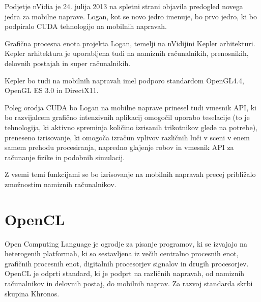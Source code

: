 

Podjetje nVidia je 24. julija 2013 \cite{cuda-mobile} na spletni strani objavila predogled novega jedra za mobilne naprave. Logan, kot se novo jedro imenuje, bo prvo jedro, ki bo podpiralo CUDA tehnologijo na mobilnih napravah.

Grafična procesna enota projekta Logan, temelji na nVidijini Kepler arhitekturi. Kepler arhitektura je uporabljena tudi na namiznih računalnikih, prenosnikih, delovnih postajah in super računalnikih.

Kepler bo tudi na mobilnih napravah imel podporo standardom OpenGL4.4, OpenGL ES 3.0 in DirectX11.

Poleg orodja CUDA bo Logan na mobilne naprave prinesel tudi vmesnik API, ki bo razvijalcem grafično intenzivnih aplikacij omogočil uporabo teselacije (to je tehnologija, ki aktivno spreminja količino izrisanih trikotnikov glede na potrebe), preneseno izrisovanje, ki omogoča izračun vplivov različnih luči v sceni v enem samem prehodu procesiranja, napredno glajenje robov in vmesnik API za računanje fizike in podobnih simulacij.

Z vsemi temi funkcijami se bo izrisovanje na mobilnih napravah precej približalo zmožnostim namiznih računalnikov. 
 

\section{OpenCL}

Open Computing Language \cite{opencl} je ogrodje za pisanje programov, ki se izvajajo na heterogenih platformah, ki so sestavljena iz večih centralno procesnih enot, grafičnih procesnih enot, digitalnih procesorjev signalov in drugih procesorjev. OpenCL je odprti standard, ki je podprt na različnih napravah, od namiznih računalnikov in delovnih postaj, do mobilnih naprav. Za razvoj standarda skrbi skupina Khronos.

